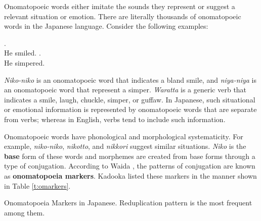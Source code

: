 \documentclass[english]{jnlp_1.4}
\begin{document}
Onomatopoeic words either imitate the sounds they represent or suggest a relevant situation or emotion.
There are literally thousands of onomatopoeic words in the Japanese language.
Consider the following examples:
\begin{exe}
	.\\
	\hspace{5mm}He \hspace{15mm}smiled.
	\label{ex:niconico}
	.\\
	\hspace{5mm}He \hspace{13mm}simpered.
	\label{ex:niyaniya}
\end{exe}
{\it Niko-niko} is an onomatopoeic word that indicates a bland smile, and {\it niya-niya} is an onomatopoeic word that represent a simper.
{\it Waratta} is a generic verb that indicates a smile, laugh, chuckle, simper, or guffaw.
In Japanese, such situational or emotional information is represented by onomatopoeic words that are separate from verbs;
whereas in English, verbs tend to include such information.

Onomatopoeic words have phonological and morphological systematicity.
For example, {\it niko-niko}, {\it nikotto}, and {\it nikkori} suggest similar situations.
{\it Niko} is the {\bf base} form of these words and
morphemes are created from base forms through a type of conjugation.
According to Waida \cite{waida1984}, the patterns of conjugation are known as {\bf onomatopoeia markers}.
Kadooka \cite{kadooka2002} listed these markers in the manner shown in Table \ref{t:omarkers}.

\begin{table}[t]
\caption{Onomatopoeia Markers in Japanese. Reduplication pattern is the most frequent among them.}
\label{t:omarkers}

\end{table}
\end{document}
